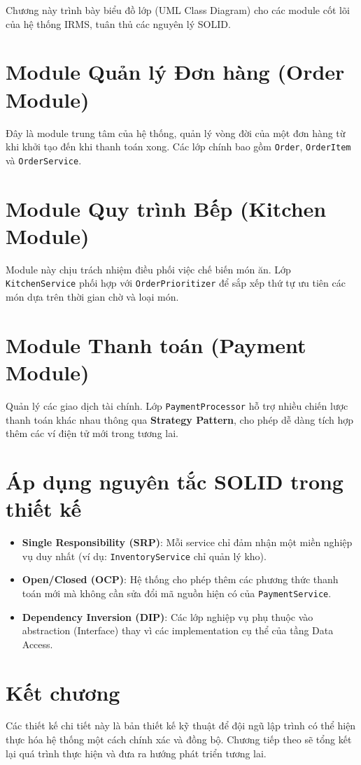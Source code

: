 Chương này trình bày biểu đồ lớp (UML Class Diagram) cho các module cốt lõi của hệ thống IRMS, tuân thủ các nguyên lý SOLID.

\section{Module Quản lý Đơn hàng (Order Module)}
Đây là module trung tâm của hệ thống, quản lý vòng đời của một đơn hàng từ khi khởi tạo đến khi thanh toán xong. Các lớp chính bao gồm \texttt{Order}, \texttt{OrderItem} và \texttt{OrderService}.

\section{Module Quy trình Bếp (Kitchen Module)}
Module này chịu trách nhiệm điều phối việc chế biến món ăn. Lớp \texttt{KitchenService} phối hợp với \texttt{OrderPrioritizer} để sắp xếp thứ tự ưu tiên các món dựa trên thời gian chờ và loại món.

\section{Module Thanh toán (Payment Module)}
Quản lý các giao dịch tài chính. Lớp \texttt{PaymentProcessor} hỗ trợ nhiều chiến lược thanh toán khác nhau thông qua \textbf{Strategy Pattern}, cho phép dễ dàng tích hợp thêm các ví điện tử mới trong tương lai.

\section{Áp dụng nguyên tắc SOLID trong thiết kế}
\begin{itemize}
    \item \textbf{Single Responsibility (SRP)}: Mỗi service chỉ đảm nhận một miền nghiệp vụ duy nhất (ví dụ: \texttt{InventoryService} chỉ quản lý kho).
    \item \textbf{Open/Closed (OCP)}: Hệ thống cho phép thêm các phương thức thanh toán mới mà không cần sửa đổi mã nguồn hiện có của \texttt{PaymentService}.
    \item \textbf{Dependency Inversion (DIP)}: Các lớp nghiệp vụ phụ thuộc vào abstraction (Interface) thay vì các implementation cụ thể của tầng Data Access.
\end{itemize}

\section{Kết chương}
Các thiết kế chi tiết này là bản thiết kế kỹ thuật để đội ngũ lập trình có thể hiện thực hóa hệ thống một cách chính xác và đồng bộ. Chương tiếp theo sẽ tổng kết lại quá trình thực hiện và đưa ra hướng phát triển tương lai.
